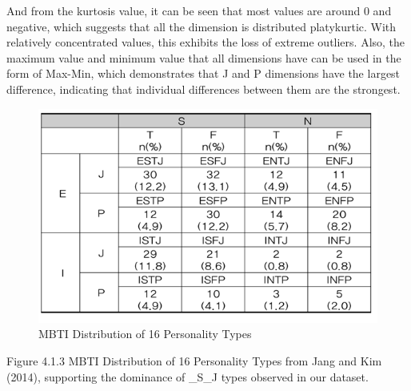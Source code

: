 \documentclass[12pt]{article}
\begin{document}
	And from the kurtosis value, it can be seen that most values are around 0 and negative, which suggests that all the dimension is distributed platykurtic. With relatively concentrated values, this exhibits the loss of extreme outliers. Also, the maximum value and minimum value that all dimensions have can be used in the form of Max-Min, which demonstrates that J and P dimensions have the largest difference, indicating that individual differences between them are the strongest.
	\begin{figure}[H]
		\centering
		\includegraphics{Q1EDA7} 
		\caption{MBTI Distribution of 16 Personality Types}		
	\end{figure}
	
	Figure 4.1.3 MBTI Distribution of 16 Personality Types from Jang and Kim (2014), supporting the dominance of \_S\_J types observed in our dataset. 
	
\end{document}
